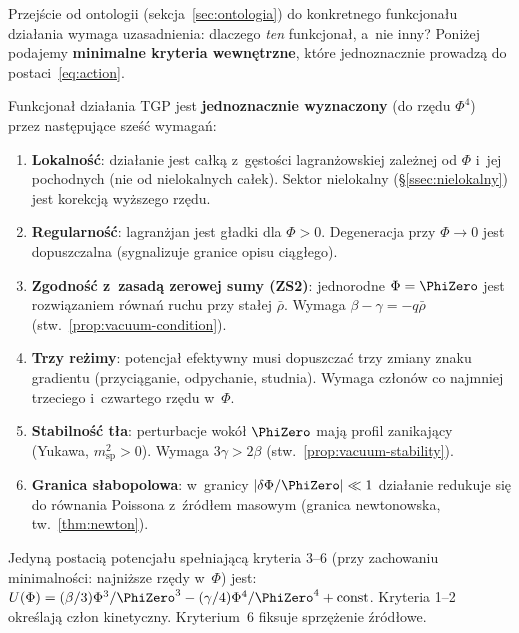 Przej\'scie od ontologii (sekcja~\ref{sec:ontologia}) do
konkretnego funkcjona\l{}u dzia\l{}ania wymaga uzasadnienia:
dlaczego \emph{ten} funkcjona\l{}, a~nie inny? Poni\.zej
podajemy \textbf{minimalne kryteria wewn\k{e}trzne},
kt\'ore jednoznacznie prowadz\k{a} do postaci~\eqref{eq:action}.

\begin{remark}\label{rem:action-criteria}
Funkcjona\l{} dzia\l{}ania TGP jest \textbf{jednoznacznie wyznaczony}
(do rz\k{e}du $\Phi^4$) przez nast\k{e}puj\k{a}ce sze\'s\'c wymaga\'n:
\begin{enumerate}[nosep]
  \item \textbf{Lokalno\'s\'c}: dzia\l{}anie jest ca\l{}k\k{a}
    z~g\k{e}sto\'sci lagran\.zowskiej zale\.znej od $\Phi$
    i~jej pochodnych (nie od nielokalnych ca\l{}ek).
    Sektor nielokalny (\S\ref{ssec:nielokalny}) jest
    korekcj\k{a} wy\.zszego rz\k{e}du.
  \item \textbf{Regularno\'s\'c}: lagran\.zjan jest g\l{}adki
    dla $\Phi > 0$. Degeneracja przy $\Phi \to 0$ jest
    dopuszczalna (sygnalizuje granice opisu ci\k{a}g\l{}ego).
  \item \textbf{Zgodno\'s\'c z~zasad\k{a} zerowej sumy (ZS2)}:
    jednorodne $\Phi = \PhiZero$ jest rozwi\k{a}zaniem
    r\'owna\'n ruchu przy sta\l{}ej $\bar{\rho}$.
    Wymaga $\beta - \gamma = -q\bar{\rho}$ (stw.~\ref{prop:vacuum-condition}).
  \item \textbf{Trzy re\.zimy}: potencja\l{} efektywny musi
    dopuszcza\'c trzy zmiany znaku gradientu (przyci\k{a}ganie,
    odpychanie, studnia). Wymaga cz\l{}on\'ow co najmniej
    trzeciego i~czwartego rz\k{e}du w~$\Phi$.
  \item \textbf{Stabilno\'s\'c t\l{}a}: perturbacje wok\'o\l{}
    $\PhiZero$ maj\k{a} profil zanikaj\k{a}cy (Yukawa, $m_{\mathrm{sp}}^2 > 0$).
    Wymaga $3\gamma > 2\beta$ (stw.~\ref{prop:vacuum-stability}).
  \item \textbf{Granica s\l{}abopolowa}: w~granicy
    $|\delta\Phi/\PhiZero| \ll 1$ dzia\l{}anie redukuje si\k{e}
    do r\'ownania Poissona z~\'zr\'od\l{}em masowym
    (granica newtonowska, tw.~\ref{thm:newton}).
\end{enumerate}
Jedyn\k{a} postaci\k{a} potencja\l{}u spe\l{}niaj\k{a}c\k{a}
kryteria 3--6 (przy zachowaniu minimalno\'sci: najni\.zsze
rz\k{e}dy w~$\Phi$) jest:
$U(\Phi) = (\beta/3)\Phi^3/\PhiZero^3
- (\gamma/4)\Phi^4/\PhiZero^4 + \mathrm{const}$.
Kryteria 1--2 okre\'slaj\k{a} cz\l{}on kinetyczny.
Kryterium~6 fiksuje sprz\k{e}\.zenie \'zr\'od\l{}owe.
\end{remark}

